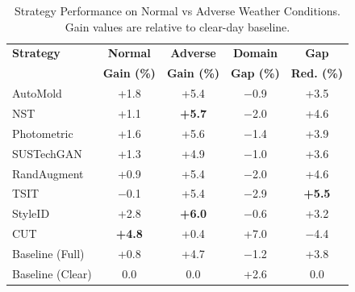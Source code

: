 
\begin{table}[t]
\centering
\caption{Strategy Performance on Normal vs Adverse Weather Conditions. Gain values are relative to clear-day baseline.}
\label{tab:normal_adverse}
\begin{tabular}{@{}lcccc@{}}
\toprule
\textbf{Strategy} & \textbf{Normal} & \textbf{Adverse} & \textbf{Domain} & \textbf{Gap} \\
 & \textbf{Gain (\%)} & \textbf{Gain (\%)} & \textbf{Gap (\%)} & \textbf{Red. (\%)} \\
\midrule
AutoMold & +1.8 & +5.4 & $-$0.9 & +3.5 \\
NST & +1.1 & \textbf{+5.7} & $-$2.0 & +4.6 \\
Photometric & +1.6 & +5.6 & $-$1.4 & +3.9 \\
SUSTechGAN & +1.3 & +4.9 & $-$1.0 & +3.6 \\
RandAugment & +0.9 & +5.4 & $-$2.0 & +4.6 \\
TSIT & $-$0.1 & +5.4 & $-$2.9 & \textbf{+5.5} \\
StyleID & +2.8 & \textbf{+6.0} & $-$0.6 & +3.2 \\
CUT & \textbf{+4.8} & +0.4 & +7.0 & $-$4.4 \\
\midrule
Baseline (Full) & +0.8 & +4.7 & $-$1.2 & +3.8 \\
Baseline (Clear) & 0.0 & 0.0 & +2.6 & 0.0 \\
\bottomrule
\end{tabular}
\end{table}



